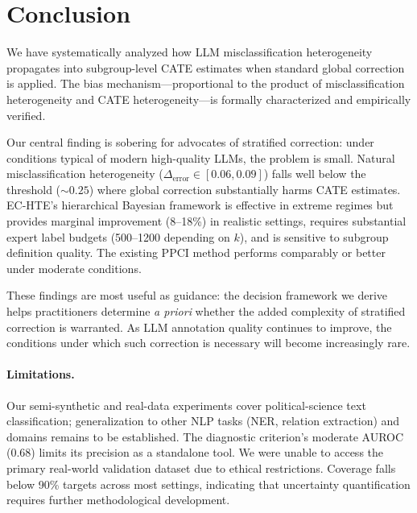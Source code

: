 \documentclass[11pt,a4paper]{article}
\begin{document}
\section{Conclusion}

We have systematically analyzed how LLM misclassification heterogeneity propagates into subgroup-level CATE estimates when standard global correction is applied. The bias mechanism---proportional to the product of misclassification heterogeneity and CATE heterogeneity---is formally characterized and empirically verified.

Our central finding is sobering for advocates of stratified correction: under conditions typical of modern high-quality LLMs, the problem is small. Natural misclassification heterogeneity ($\Delta_{\text{error}} \in [0.06, 0.09]$) falls well below the threshold ($\sim 0.25$) where global correction substantially harms CATE estimates. EC-HTE's hierarchical Bayesian framework is effective in extreme regimes but provides marginal improvement (8--18\%) in realistic settings, requires substantial expert label budgets (500--1200 depending on $k$), and is sensitive to subgroup definition quality. The existing PPCI method performs comparably or better under moderate conditions.

These findings are most useful as guidance: the decision framework we derive helps practitioners determine \emph{a priori} whether the added complexity of stratified correction is warranted. As LLM annotation quality continues to improve, the conditions under which such correction is necessary will become increasingly rare.

\paragraph{Limitations.} Our semi-synthetic and real-data experiments cover political-science text classification; generalization to other NLP tasks (NER, relation extraction) and domains remains to be established. The diagnostic criterion's moderate AUROC (0.68) limits its precision as a standalone tool. We were unable to access the primary real-world validation dataset due to ethical restrictions. Coverage falls below 90\% targets across most settings, indicating that uncertainty quantification requires further methodological development.
\end{document}
